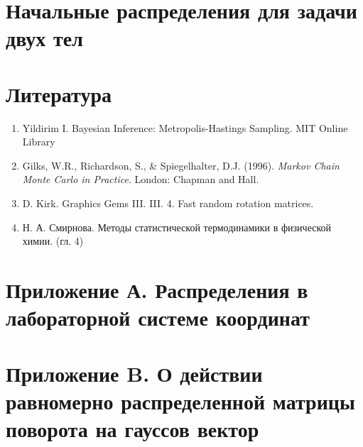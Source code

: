 \documentclass[12pt]{article}
\begin{document}
\section{Начальные распределения для задачи двух тел}







\newpage
\section{Литература}
\begin{enumerate}
	\item Yildirim I. Bayesian Inference: Metropolis-Hastings Sampling. MIT Online Library
	\item Gilks, W.R., Richardson, S., \& Spiegelhalter, D.J. (1996). \textit{Markov Chain Monte Carlo in Practice}. London: Chapman and Hall.
	\item  D. Kirk. Graphics Gems III. III. 4. Fast random rotation matrices. 
	\item Н. А. Смирнова. Методы статистической термодинамики в физической химии. (гл. 4)
\end{enumerate}

\newpage


\begin{appendices}
\section{Приложение А. Распределения в лабораторной системе координат} \label{app1}



\section{Приложение B. О действии равномерно распределенной матрицы поворота на гауссов вектор} \label{app2}



\end{appendices}
\end{document}
